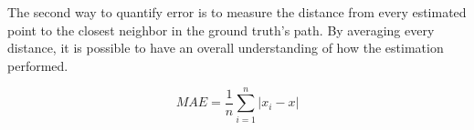 The second way to quantify error is to measure the distance from every estimated point to the closest neighbor in the ground truth's path. By averaging every distance, it is possible to have an overall understanding of how the estimation performed.

\begin{figure}[!h]
    \centering
    \begin{subfigure}{0.75\textwidth}
        \centering
        \resizebox{1\linewidth}{!}{}
        \label{fig:square3D_error}
    \end{subfigure}


    \begin{subfigure}{0.75\textwidth}
        \centering
        \resizebox{1\linewidth}{!}{}
        \label{fig:square3D_point}
    \end{subfigure}
    \label{fig:error_methods_3D}
\end{figure}


\begin{equation}
    MAE = \frac{1}{n}\sum_{i = 1}^{n} \left\lvert x_i - x\right\rvert
\end{equation}

